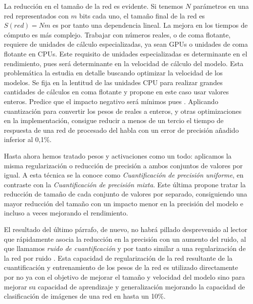 La reducción en el tamaño de la red es evidente. Si tenemos $N$ parámetros en una red representados con $m$ bits cada uno, el tamaño final de la red es $S(red)=Nm$ es por tanto una dependencia lineal. La mejora en los tiempos de cómputo es más complejo. Trabajar con números reales, o de coma flotante, requiere de unidades de cálculo especializadas, ya sean GPUs o unidades de coma flotante en CPUs. Este requisito de unidades especializadas es determinante en el rendimiento, pues será determinante en la velocidad de cálculo del modelo. Esta problemática la estudia en detalle  buscando optimizar la velocidad de los modelos. Se fija en la lentitud de las unidades CPU para realizar grandes cantidades de cálculos en coma flotante y propone en este caso usar valores enteros. Predice que el impacto negativo será mínimos pues . Aplicando cuantización para convertir los pesos de reales a enteros, y otras optimizaciones en la implementación, consigue reducir a menos de un tercio el tiempo de respuesta de una red de procesado del habla con un error de precisión añadido inferior al 0,1\%.

Hasta ahora hemos tratado pesos y activaciones como un todo: aplicamos la misma regularización o reducción de precisión a ambos conjuntos de valores por igual. A esta técnica se la conoce como \textit{Cuantificación de precisión uniforme}, en contraste con la \textit{Cuantificación de precisión mixta}. Este última propone tratar la reducción de tamaño de cada conjunto de valores por separado, consiguiendo una mayor reducción del tamaño con un impacto menor en la precisión del modelo \cite{Jin2019} e incluso a veces mejorando el rendimiento. 

El resultado del último párrafo, de nuevo, no habrá pillado desprevenido al lector que rápidamente asocia la reducción en la precisión con un aumento del ruido, al que llamamos \textit{ruido de cuantificación} y por tanto similar a una regularización de la red por ruido \cite{Bishop1995,Noh2017}. Esta capacidad de regularización de la red resultante de la cuantificación y entrenamiento de los pesos de la red es utilizado directamente por  no ya con el objetivo de mejorar el tamaño y velocidad del modelo sino para mejorar su capacidad de aprendizaje y generalización mejorando la capacidad de clasificación de imágenes de una red en hasta un 10\%. 

